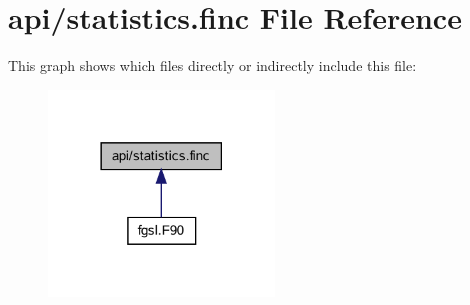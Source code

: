 \hypertarget{statistics_8finc}{}\section{api/statistics.finc File Reference}
\label{statistics_8finc}
This graph shows which files directly or indirectly include this file\+:\nopagebreak
\begin{figure}[H]
\begin{center}
\leavevmode
\includegraphics[width=170pt]{statistics_8finc__dep__incl}
\end{center}
\end{figure}
